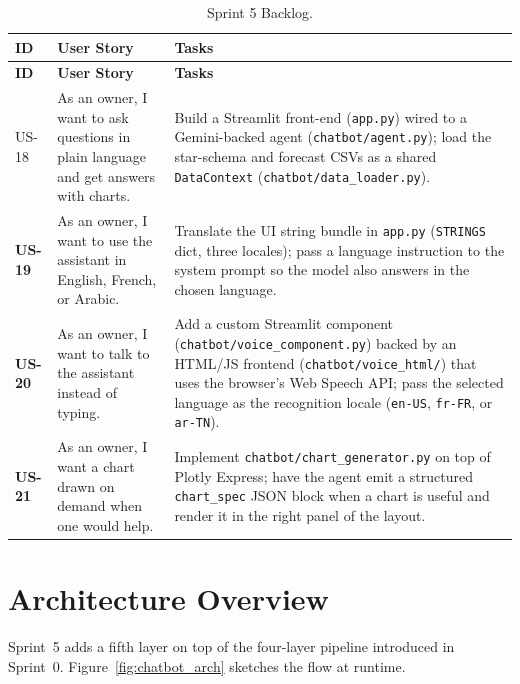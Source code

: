 \documentclass[12pt, a4paper]{report}
\begin{document}
\begin{longtable}{>{\bfseries}p{1.3cm} p{4.4cm} p{7cm}}
  \caption{Sprint 5 Backlog.\label{tab:sprint5_backlog}} \\
  \toprule
  \textbf{ID} & \textbf{User Story} & \textbf{Tasks} \\
  \midrule
  \endfirsthead
  \toprule
  \textbf{ID} & \textbf{User Story} & \textbf{Tasks} \\
  \midrule
  \endhead
  \bottomrule
  \endfoot

  US-18 & As an owner, I want to ask questions in plain language and get
          answers with charts.
        & Build a Streamlit front-end (\texttt{app.py}) wired to a Gemini-backed
          agent (\texttt{chatbot/agent.py}); load the star-schema and forecast
          CSVs as a shared \texttt{DataContext} (\texttt{chatbot/data\_loader.py}). \\[4pt]

  US-19 & As an owner, I want to use the assistant in English, French, or
          Arabic.
        & Translate the UI string bundle in \texttt{app.py} (\texttt{STRINGS}
          dict, three locales); pass a language instruction to the system
          prompt so the model also answers in the chosen language. \\[4pt]

  US-20 & As an owner, I want to talk to the assistant instead of typing.
        & Add a custom Streamlit component (\texttt{chatbot/voice\_component.py})
          backed by an HTML/JS frontend (\texttt{chatbot/voice\_html/}) that
          uses the browser's Web Speech API; pass the selected language as
          the recognition locale (\texttt{en-US}, \texttt{fr-FR}, or \texttt{ar-TN}). \\[4pt]

  US-21 & As an owner, I want a chart drawn on demand when one would help.
        & Implement \texttt{chatbot/chart\_generator.py} on top of Plotly
          Express; have the agent emit a structured \texttt{chart\_spec}
          JSON block when a chart is useful and render it in the right
          panel of the layout. \\
\end{longtable}

\section{Architecture Overview}

Sprint~5 adds a fifth layer on top of the four-layer pipeline introduced
in Sprint~0. Figure~\ref{fig:chatbot_arch} sketches the flow at runtime.
\end{document}
